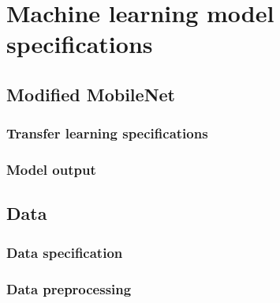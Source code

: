 \chapter{Machine learning model specifications}
\label{chap:model}

\section{Modified MobileNet}
\label{sec:modelsec1}

\subsection{Transfer learning specifications}
\label{sec:modelsec1subsec1}

\subsection{Model output}
\label{sec:modelsec1subsec2}

\section{Data}
\label{sec:modelsec2}

\subsection{Data specification}
\label{sec:modelsec2subsec1}

\subsection{Data preprocessing}
\label{sec:modelsec2subsec2}